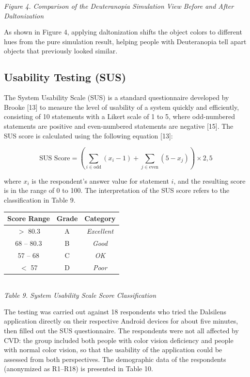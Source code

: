 \begin{center}
  {\footnotesize\textit{Figure 4. Comparison of the Deuteranopia Simulation View Before and After Daltonization}}
\end{center}

As shown in Figure 4, applying daltonization shifts the object colors to different hues from the pure simulation result, helping people with Deuteranopia tell apart objects that previously looked similar.

\subsection{Usability Testing (SUS)}

The System Usability Scale (SUS) is a standard questionnaire developed by Brooke [13] to measure the level of usability of a system quickly and efficiently, consisting of 10 statements with a Likert scale of 1 to 5, where odd-numbered statements are positive and even-numbered statements are negative [15]. The SUS score is calculated using the following equation [13]:

\begin{equation}
\text{SUS Score} = \left(\sum_{i \in \text{odd}}(x_i - 1) + \sum_{j \in \text{even}}(5 - x_j)\right) \times 2{,}5
\end{equation}

where $x_i$ is the respondent's answer value for statement $i$, and the resulting score is in the range of 0 to 100. The interpretation of the SUS score refers to the classification in Table 9.

\begin{table}[H]
  \centering
  {\footnotesize
  \begin{tabular}{|c|c|c|}
    \hline
    \textbf{Score Range} & \textbf{Grade} & \textbf{Category} \\
    \hline
    $>$ 80.3 & A & \textit{Excellent} \\ \hline
    68 -- 80.3 & B & \textit{Good} \\ \hline
    57 -- 68 & C & \textit{OK} \\ \hline
    $<$ 57 & D & \textit{Poor} \\ \hline
  \end{tabular}}\\[0.3em]
  {\footnotesize\textit{Table 9. System Usability Scale Score Classification}}
\end{table}

The testing was carried out against 18 respondents who tried the Dalsilens application directly on their respective Android devices for about five minutes, then filled out the SUS questionnaire. The respondents were not all affected by CVD: the group included both people with color vision deficiency and people with normal color vision, so that the usability of the application could be assessed from both perspectives. The demographic data of the respondents (anonymized as R1--R18) is presented in Table 10.


